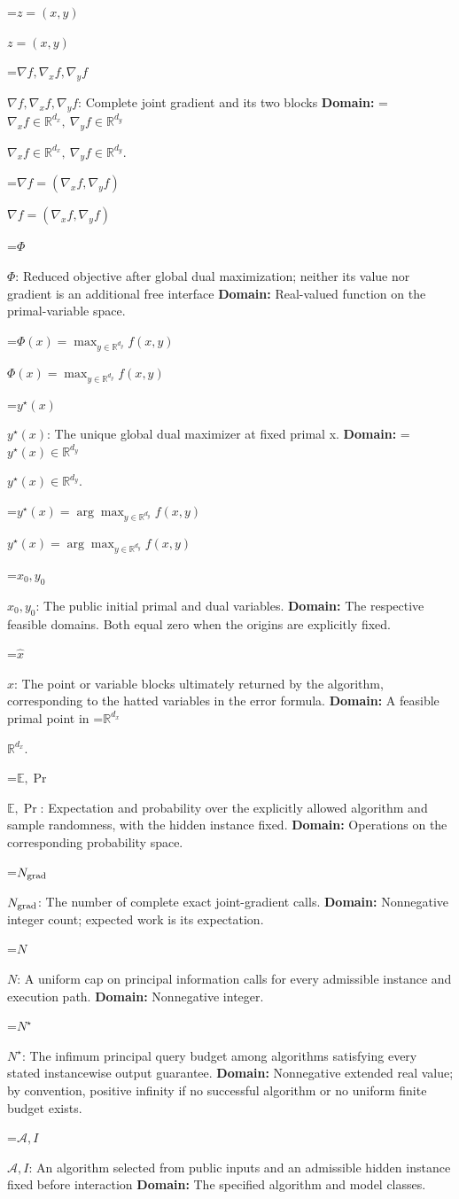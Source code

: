 \documentclass[10pt,a4paper]{article}
\newcommand{\AtlasMath}[1]{\par\begingroup\centering\setbox0=\hbox{$\displaystyle #1$}\ifdim\wd0>1.4\linewidth\typeout{ATLAS WIDE FORMULA: \the\wd0}\fi\ifdim\wd0>\linewidth\resizebox{\linewidth}{!}{\box0}\else\box0\fi\par\endgroup}
\newcommand{\AtlasInlineMath}[1]{\begingroup\setbox0=\hbox{$#1$}\ifdim\wd0>.4\linewidth\endgroup\AtlasMath{#1}\else\endgroup$#1$\fi}
\begin{document}
\AtlasInlineMath{z=(x,y)}

\AtlasInlineMath{\nabla f,\nabla_x f,\nabla_y f}: Complete joint gradient and its two blocks \textbf{Domain:} \AtlasInlineMath{\nabla_x f\in\mathbb R^{d_x},\ \nabla_y f\in\mathbb R^{d_y}}.

\AtlasInlineMath{\nabla f=(\nabla_x f,\nabla_y f)}

\AtlasInlineMath{\Phi}: Reduced objective after global dual maximization; neither its value nor gradient is an additional free interface \textbf{Domain:} Real-valued function on the primal-variable space.

\AtlasInlineMath{\Phi(x)=\max_{y\in \mathbb R^{d_y}}f(x,y)}

\AtlasInlineMath{y^\star(x)}: The unique global dual maximizer at fixed primal x. \textbf{Domain:} \AtlasInlineMath{y^\star(x)\in\mathbb R^{d_y}}.

\AtlasInlineMath{y^\star(x)=\arg\max_{y\in\mathbb R^{d_y}}f(x,y)}

\AtlasInlineMath{x_0,y_0}: The public initial primal and dual variables. \textbf{Domain:} The respective feasible domains. Both equal zero when the origins are explicitly fixed.

\AtlasInlineMath{\widehat x}: The point or variable blocks ultimately returned by the algorithm, corresponding to the hatted variables in the error formula. \textbf{Domain:} A feasible primal point in \AtlasInlineMath{\mathbb R^{d_x}}.

\AtlasInlineMath{\mathbb E,\Pr}: Expectation and probability over the explicitly allowed algorithm and sample randomness, with the hidden instance fixed. \textbf{Domain:} Operations on the corresponding probability space.

\AtlasInlineMath{N_{\rm grad}}: The number of complete exact joint-gradient calls. \textbf{Domain:} Nonnegative integer count; expected work is its expectation.

\AtlasInlineMath{N}: A uniform cap on principal information calls for every admissible instance and execution path. \textbf{Domain:} Nonnegative integer.

\AtlasInlineMath{N^\star}: The infimum principal query budget among algorithms satisfying every stated instancewise output guarantee. \textbf{Domain:} Nonnegative extended real value; by convention, positive infinity if no successful algorithm or no uniform finite budget exists.

\AtlasInlineMath{\mathcal A,I}: An algorithm selected from public inputs and an admissible hidden instance fixed before interaction \textbf{Domain:} The specified algorithm and model classes.
\end{document}

